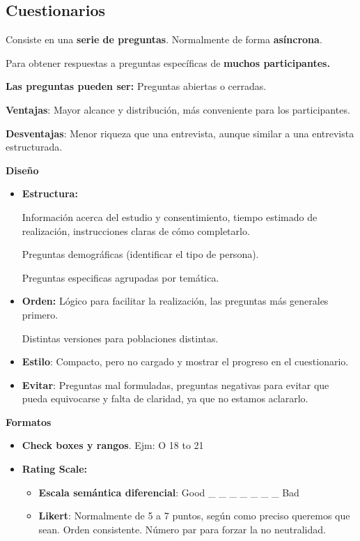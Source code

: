 \documentclass[12pt]{report} %
\begin{document}
\subsection{Cuestionarios}

Consiste en una \textbf{serie de preguntas}. Normalmente de forma
\textbf{asíncrona}.

Para obtener respuestas a preguntas específicas de \textbf{muchos
participantes.}

\textbf{Las preguntas pueden ser:} Preguntas abiertas o cerradas.

\textbf{Ventajas}: Mayor alcance y distribución, más conveniente para
los participantes.

\textbf{Desventajas}: Menor riqueza que una entrevista, aunque similar a
una entrevista estructurada.

\textbf{Diseño}

\begin{itemize}
\item
  \textbf{Estructura:}

  Información acerca del estudio y consentimiento, tiempo estimado de
  realización, instrucciones claras de cómo completarlo.

  Preguntas demográficas (identificar el tipo de persona).

  Preguntas especificas agrupadas por temática.
\item
  \textbf{Orden:} Lógico para facilitar la realización, las preguntas
  más generales primero.

  Distintas versiones para poblaciones distintas.
\item
  \textbf{Estilo}: Compacto, pero no cargado y mostrar el progreso en el
  cuestionario.
\item
  \textbf{Evitar}: Preguntas mal formuladas, preguntas negativas para
  evitar que pueda equivocarse y falta de claridad, ya que no estamos
  aclararlo.
\end{itemize}

\textbf{Formatos}

\begin{itemize}
\item
  \textbf{Check boxes y rangos}. Ejm: O 18 to 21
\item
  \textbf{Rating Scale:}

  \begin{itemize}
  
  \item
    \textbf{Escala semántica diferencial}: Good \_ \_ \_ \_ \_ \_ \_ Bad
    
    \item
      \textbf{Likert}: Normalmente de 5 a 7 puntos, según como preciso
      queremos que sean. Orden consistente. Número par para forzar la no
      neutralidad.
  \end{itemize}
\end{itemize}
\end{document}
